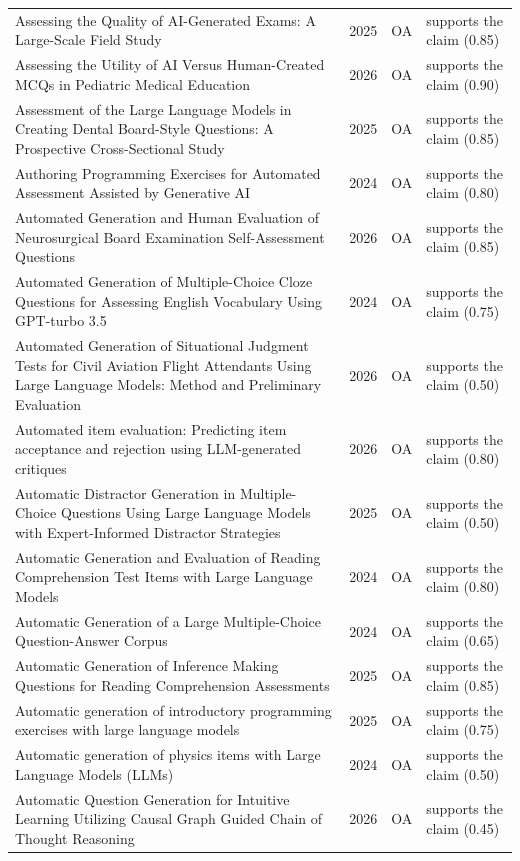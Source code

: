 \begin{longtable}{@{}%
  >{\raggedright\arraybackslash}p{}c%
  >{\raggedright\arraybackslash}p{}%
  >{\raggedright\arraybackslash}p{}@{}}
Assessing the Quality of AI-Generated Exams: A Large-Scale Field Study & 2025 & OA & supports the claim (0.85) \\
Assessing the Utility of AI Versus Human-Created MCQs in Pediatric Medical Education & 2026 & OA & supports the claim (0.90) \\
Assessment of the Large Language Models in Creating Dental Board-Style Questions: A Prospective Cross-Sectional Study & 2025 & OA & supports the claim (0.85) \\
Authoring Programming Exercises for Automated Assessment Assisted by Generative AI & 2024 & OA & supports the claim (0.80) \\
Automated Generation and Human Evaluation of Neurosurgical Board Examination Self-Assessment Questions & 2026 & OA & supports the claim (0.85) \\
Automated Generation of Multiple-Choice Cloze Questions for Assessing English Vocabulary Using GPT-turbo 3.5 & 2024 & OA & supports the claim (0.75) \\
Automated Generation of Situational Judgment Tests for Civil Aviation Flight Attendants Using Large Language Models: Method and Preliminary Evaluation & 2026 & OA & supports the claim (0.50) \\
Automated item evaluation: Predicting item acceptance and rejection using LLM-generated critiques & 2026 & OA & supports the claim (0.80) \\
Automatic Distractor Generation in Multiple-Choice Questions Using Large Language Models with Expert-Informed Distractor Strategies & 2025 & OA & supports the claim (0.50) \\
Automatic Generation and Evaluation of Reading Comprehension Test Items with Large Language Models & 2024 & OA & supports the claim (0.80) \\
Automatic Generation of a Large Multiple-Choice Question-Answer Corpus & 2024 & OA & supports the claim (0.65) \\
Automatic Generation of Inference Making Questions for Reading Comprehension Assessments & 2025 & OA & supports the claim (0.85) \\
Automatic generation of introductory programming exercises with large language models & 2025 & OA & supports the claim (0.75) \\
Automatic generation of physics items with Large Language Models (LLMs) & 2024 & OA & supports the claim (0.50) \\
Automatic Question Generation for Intuitive Learning Utilizing Causal Graph Guided Chain of Thought Reasoning & 2026 & OA & supports the claim (0.45) \\

\end{longtable}
